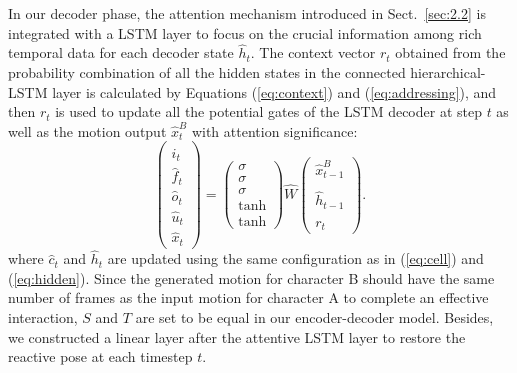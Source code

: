 \documentclass[times,twocolumn,final]{elsarticle}
\begin{document}
In our decoder phase, the attention mechanism introduced in Sect.~\ref{sec:2.2} is integrated with a LSTM layer to focus on the crucial information among rich temporal data for each decoder state $\hat{h}_{t}$. The context vector $r_{t}$ obtained from the probability combination of all the hidden states in the connected hierarchical-LSTM layer is calculated by Equations (\ref{eq:context}) and (\ref{eq:addressing}), and then $r_{t}$ is used to update all the potential gates of the LSTM decoder at step $t$ as well as the motion output $\hat{x}_{t}^{B}$ with attention significance:
\begin{equation}
\begin{pmatrix}\hat{i}_{t}\\\hat{f}_{t}\\\hat{o}_{t}\\\hat{u}_{t}\\\hat{x}_{t}\end{pmatrix}=\begin{pmatrix}\sigma\\ \sigma\\\sigma\\\tanh\\\tanh\end{pmatrix}\hat{W}\begin{pmatrix}\hat{x}_{t-1}^{B}\\\\ \hat{h}_{t-1}\\\\r_{t}\end{pmatrix}.
\end{equation}
where $\hat{c}_{t}$ and $\hat{h}_{t}$ are updated using the same configuration as in (\ref{eq:cell}) and (\ref{eq:hidden}). Since the generated motion for character B should have the same number of frames as the input motion for character A to complete an effective interaction, $S$ and $T$ are set to be equal in our encoder-decoder model. Besides, we constructed a linear layer after the attentive LSTM layer to restore the reactive pose at each timestep $t$. 

\end{document}

